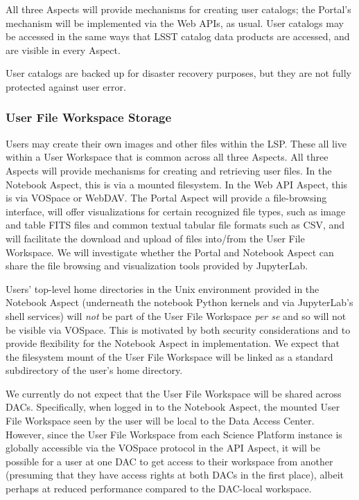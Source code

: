 All three Aspects will provide mechanisms for creating user catalogs; the
Portal's mechanism will be implemented via the Web APIs, as usual.
User catalogs may be accessed in the same ways that LSST catalog data products
are accessed, and are visible in every Aspect.

User catalogs are backed up for disaster recovery purposes, but they are not
fully protected against user error.

\subsubsection{User File Workspace Storage}\label{user-workspace-storage}

Users may create their own images and other files within the LSP.
These all live within a User Workspace that is common across all three Aspects.
All three Aspects will provide mechanisms for creating and retrieving user
files.
In the Notebook Aspect, this is via a mounted filesystem.  
In the Web API Aspect, this is via VOSpace or WebDAV.
The Portal Aspect will provide a file-browsing interface, will offer
visualizations for certain recognized file types, such as image and table
FITS files and common textual tabular file formats such as CSV, and will
facilitate the download and upload of files into/from the User File Workspace.
We will investigate whether the Portal and Notebook Aspect can share the
file browsing and visualization tools provided by JupyterLab.

Users' top-level home directories in the Unix environment provided in the
Notebook Aspect (underneath the notebook Python kernels and via JupyterLab's
shell services) will \emph{not} be part of the User File Workspace \emph{per
se} and so will not be visible via VOSpace.
This is motivated by both security considerations and to provide flexibility
for the Notebook Aspect in implementation.
We expect that the filesystem mount of the User File Workspace will be 
linked as a standard subdirectory of the user's home directory.

We currently do not expect that the User File Workspace will be shared 
across DACs.
Specifically, when logged in to the Notebook Aspect, the mounted User File
Workspace seen by the user will be local to the Data Access Center.
However, since the User File Workspace from each Science Platform instance
is globally accessible via the VOSpace protocol in the API Aspect, it will be
possible for a user at one DAC to get access to their workspace from another
(presuming that they have access rights at both DACs in the first place),
albeit perhaps at reduced performance compared to the DAC-local workspace.

